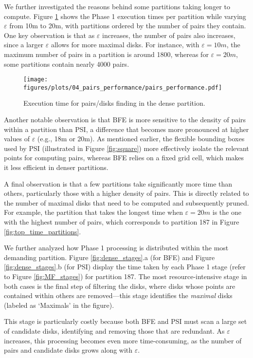 We further investigated the reasons behind some partitions taking longer to compute. Figure \ref{fig:pairs_performance} shows the Phase 1 execution times per 
partition while varying $\varepsilon$ from 10m to 20m, with partitions ordered by the number of pairs they contain. One key observation is that as $\varepsilon$ 
increases, the number of pairs also increases, since a larger $\varepsilon$ allows for more maximal disks. For instance, with $\varepsilon = 10m$, the maximum 
number of pairs in a partition is around 1800, whereas for $\varepsilon = 20m$, some partitions contain nearly 4000 pairs.

\begin{figure}
    \centering
    \texttt{[image: figures/plots/04\_pairs\_performance/pairs\_performance.pdf]}
    \caption{Execution time for pairs/disks finding in the dense partition.}
    \label{fig:pairs_performance}
\end{figure}

Another notable observation is that BFE is more sensitive to the density of pairs within a partition than PSI, a difference that becomes more pronounced at 
higher values of $\varepsilon$ (e.g., 18m or 20m). As mentioned earlier, the flexible bounding boxes used by PSI (illustrated in Figure \ref{fig:square}) more 
effectively isolate the relevant points for computing pairs, whereas BFE relies on a fixed grid cell, which makes it less efficient in denser partitions.

A final observation is that a few partitions take significantly more time than others, particularly those with a higher density of pairs. This is directly 
related to the number of maximal disks that need to be computed and subsequently pruned. For example, the partition that takes the longest time when 
$\varepsilon = 20m$ is the one with the highest number of pairs, which corresponds to partition 187 in Figure \ref{fig:top_time_partitions}.

We further analyzed how Phase 1 processing is distributed within the most demanding partition. Figure \ref{fig:dense_stages}.a (for BFE) and Figure 
\ref{fig:dense_stages}.b (for PSI) display the time taken by each Phase 1 stage (refer to Figure \ref{fig:MF_stages}) for partition 187. The most 
resource-intensive stage in both cases is the final step of filtering the disks, where disks whose points are contained within others are removed—this stage 
identifies the \textit{maximal} disks (labeled as `Maximals' in the figure).

This stage is particularly costly because both BFE and PSI must scan a large set of candidate disks, identifying and removing those that are redundant. As 
$\varepsilon$ increases, this processing becomes even more time-consuming, as the number of pairs and candidate disks grows along with $\varepsilon$.

